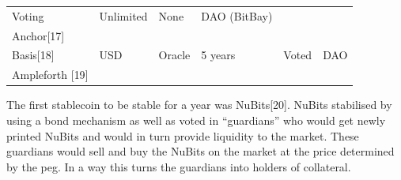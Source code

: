 \documentclass[english,]{IEEEtran}
\begin{document}
\begin{longtable}[]{@{}llllll@{}}
\begin{minipage}[t]{0.19\columnwidth}
Voting\strut
\end{minipage} & \begin{minipage}[t]{0.09\columnwidth}\raggedright\strut
Unlimited\strut
\end{minipage} & \begin{minipage}[t]{0.08\columnwidth}\raggedright\strut
None\strut
\end{minipage} & \begin{minipage}[t]{0.15\columnwidth}\raggedright\strut
DAO (BitBay)\strut
\end{minipage}\tabularnewline
\begin{minipage}[t]{0.27\columnwidth}\raggedright\strut
Anchor{[}17{]}\strut
\end{minipage} & \begin{minipage}[t]{0.06\columnwidth}\raggedright\strut
\strut
\end{minipage}\tabularnewline
\begin{minipage}[t]{0.27\columnwidth}\raggedright\strut
Basis{[}18{]}\strut
\end{minipage} & \begin{minipage}[t]{0.06\columnwidth}\raggedright\strut
USD\strut
\end{minipage} & \begin{minipage}[t]{0.19\columnwidth}\raggedright\strut
Oracle\strut
\end{minipage} & \begin{minipage}[t]{0.09\columnwidth}\raggedright\strut
5 years\strut
\end{minipage} & \begin{minipage}[t]{0.08\columnwidth}\raggedright\strut
Voted\strut
\end{minipage} & \begin{minipage}[t]{0.15\columnwidth}\raggedright\strut
DAO\strut
\end{minipage}\tabularnewline
\begin{minipage}[t]{0.27\columnwidth}\raggedright\strut
Ampleforth {[}19{]}\strut
\end{minipage} & \begin{minipage}[t]{0.06\columnwidth}\raggedright\strut
\strut
\end{minipage}\tabularnewline
\bottomrule
\end{longtable}

The first stablecoin to be stable for a year was NuBits{[}20{]}. NuBits
stabilised by using a bond mechanism as well as voted in ``guardians''
who would get newly printed NuBits and would in turn provide liquidity
to the market. These guardians would sell and buy the NuBits on the
market at the price determined by the peg. In a way this turns the
guardians into holders of collateral.
\end{document}
